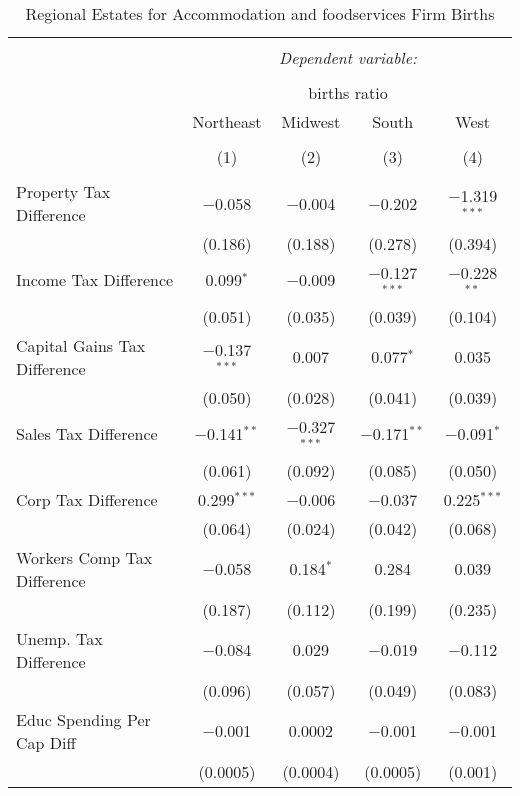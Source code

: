 
\begin{table}[!htbp] \centering 
  \caption{Regional Estates for  Accommodation and foodservices Firm Births} 
  \label{} 
\begin{tabular}{@{\extracolsep{5pt}}lcccc} 
\\[-1.8ex]\hline 
\hline \\[-1.8ex] 
 & \multicolumn{4}{c}{\textit{Dependent variable:}} \\ 
\cline{2-5} 
\\[-1.8ex] & \multicolumn{4}{c}{births ratio} \\ 
 & Northeast & Midwest & South & West \\ 
\\[-1.8ex] & (1) & (2) & (3) & (4)\\ 
\hline \\[-1.8ex] 
 Property Tax Difference & $-$0.058 & $-$0.004 & $-$0.202 & $-$1.319$^{***}$ \\ 
  & (0.186) & (0.188) & (0.278) & (0.394) \\ 
  Income Tax Difference & 0.099$^{*}$ & $-$0.009 & $-$0.127$^{***}$ & $-$0.228$^{**}$ \\ 
  & (0.051) & (0.035) & (0.039) & (0.104) \\ 
  Capital Gains Tax Difference & $-$0.137$^{***}$ & 0.007 & 0.077$^{*}$ & 0.035 \\ 
  & (0.050) & (0.028) & (0.041) & (0.039) \\ 
  Sales Tax Difference & $-$0.141$^{**}$ & $-$0.327$^{***}$ & $-$0.171$^{**}$ & $-$0.091$^{*}$ \\ 
  & (0.061) & (0.092) & (0.085) & (0.050) \\ 
  Corp Tax Difference & 0.299$^{***}$ & $-$0.006 & $-$0.037 & 0.225$^{***}$ \\ 
  & (0.064) & (0.024) & (0.042) & (0.068) \\ 
  Workers Comp Tax Difference & $-$0.058 & 0.184$^{*}$ & 0.284 & 0.039 \\ 
  & (0.187) & (0.112) & (0.199) & (0.235) \\ 
  Unemp. Tax Difference & $-$0.084 & 0.029 & $-$0.019 & $-$0.112 \\ 
  & (0.096) & (0.057) & (0.049) & (0.083) \\ 
  Educ Spending Per Cap Diff & $-$0.001 & 0.0002 & $-$0.001 & $-$0.001 \\ 
  & (0.0005) & (0.0004) & (0.0005) & (0.001) \\ 

\end{tabular}
\end{table}
